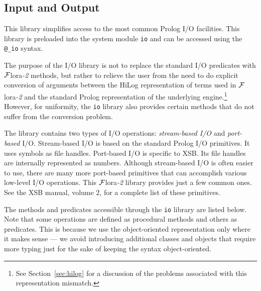 \documentclass[11pt]{article}
\newcommand{\FLORA}{{\mbox{\sc ${\cal F}${lora}\rm\emph{-2}}}\xspace}
\begin{document}
\subsection{Input and Output}

This library simplifies access to the most common Prolog I/O facilities.
This library is preloaded into the system module {\tt io} and
can be accessed using the {\tt @\_io} syntax.

The purpose of the I/O library is not to replace the standard I/O predicates
with \FLORA methods, but rather to relieve the user from the need to do
explicit conversion of arguments between the HiLog representation of terms
used in \FLORA and the standard Prolog representation of the underlying
engine.\footnote{
  See Section~\ref{sec:hilog} for a discussion of the problems associated
  with this representation mismatch.
  }
However, for uniformity, the {\tt io} library also provides certain methods
that do not suffer from the conversion problem.

The library contains two types of I/O operations: \emph{stream-based I/O}
and \emph{port-based} I/O.  Stream-based I/O is based on the standard Prolog
I/O primitives. It uses symbols as file handles. Port-based I/O is specific
to XSB. Its file handles are internally represented as numbers. Although
stream-based I/O is often easier to use, there are many more port-based
primitives that can accomplish various low-level I/O operations. This
\FLORA library provides just a few common ones. See the XSB manual, volume
2, for a complete list of these primitives.

The methods and predicates accessible through the {\tt io} library are
listed below.  Note that some operations are defined as procedural methods
and others as predicates. This is because we use the object-oriented
representation only where it makes sense --- we avoid introducing
additional classes and objects that require more typing just for the sake
of keeping the syntax object-oriented.
\end{document}
